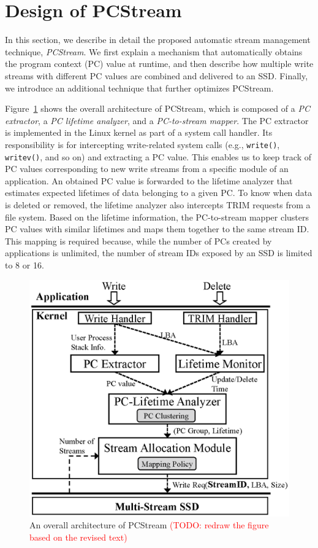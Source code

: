 \section{Design of PCStream}
In this section, we describe in detail the proposed automatic stream management
technique, \textit{PCStream}.  We first explain a mechanism that automatically
obtains the program context (PC) value at runtime, and then describe how
multiple write streams with different PC values are combined and delivered to
an SSD. Finally, we introduce an additional technique that further optimizes
PCStream.

Figure~\ref{fig:architecture} shows the overall architecture of PCStream, which
is composed of a \textit{PC extractor}, a \textit{PC lifetime analyzer}, and a
\textit{PC-to-stream mapper}.  The PC extractor is implemented in the Linux
kernel as part of a system call handler. Its responsibility is for intercepting
write-related system calls (e.g., \texttt{write()}, \texttt{writev()}, and so
on) and extracting a PC value.  This enables us to keep track of PC values
corresponding to new write streams from a specific module of an application. An
obtained PC value is forwarded to the lifetime analyzer that estimates expected
lifetimes of data belonging to a given PC. To know when data is deleted or
removed, the lifetime analyzer also intercepts TRIM requests from a file
system.  Based on the lifetime information, the PC-to-stream mapper clusters PC
values with similar lifetimes and maps them together to the same stream ID.
This mapping is required because, while the number of PCs created by applications is unlimited, the
number of stream IDs exposed by an SSD is limited to 8 or 16.

\begin{figure}[t]
	\centering
	\includegraphics[width=0.8\linewidth]{figure/architecture2}
	\caption{An overall architecture of {\sf PCStream}
	\textcolor{red}{(TODO: redraw the figure based on the revised text)}}
	\label{fig:architecture}
	\vspace{-15pt}
\end{figure}

